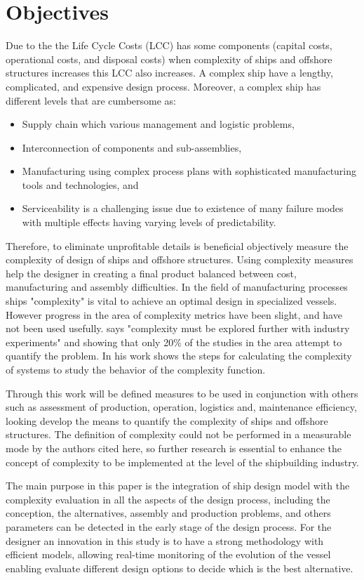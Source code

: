 \section{Objectives}
Due to the  the Life Cycle Costs (LCC) has some components (capital costs, operational costs, and disposal costs) when complexity of ships and offshore structures increases this LCC also increases. A complex ship have a lengthy, complicated, and expensive design process. Moreover, a complex ship has different levels that are cumbersome as:  
\begin{itemize}
\item Supply chain which various management and logistic problems, 
\item Interconnection of components and sub-assemblies,  
\item Manufacturing using complex process plans with sophisticated manufacturing tools and technologies, and
\item Serviceability is a challenging issue due to existence of many failure modes with multiple effects having varying levels of predictability.
\end{itemize}


Therefore, to eliminate unprofitable details is beneficial objectively measure the complexity of design of ships and offshore structures. Using complexity measures help the designer in creating a final product balanced between cost, manufacturing and assembly difficulties. In the field of manufacturing processes ships "complexity" is vital to achieve an optimal design in specialized vessels. However progress in the area of complexity metrics have been slight, and have not been used usefully.  \cite{Tang01} says "complexity must be explored further with industry experiments" and showing that only 20\% of the studies in the area attempt to quantify the problem. In his work shows the steps for calculating the complexity of systems to study the behavior of the complexity function.


Through this work will be defined measures to be used in conjunction with others such as assessment of production, operation, logistics and, maintenance efficiency, looking develop the means to quantify the complexity of ships and offshore structures. The definition of complexity could not be performed in a measurable mode by the authors cited here, so further research is essential to enhance the concept of complexity to be implemented at the level of the shipbuilding industry.


The main purpose in this paper is the integration of  ship design model with the complexity evaluation in all the aspects of the  design process, including the  conception, the alternatives, assembly and production problems, and others parameters can be detected in the early stage of the design process. For the designer an innovation in this study is to have a strong methodology with efficient models, allowing real-time monitoring of the evolution of the vessel enabling evaluate different design options to decide which is the best alternative.
